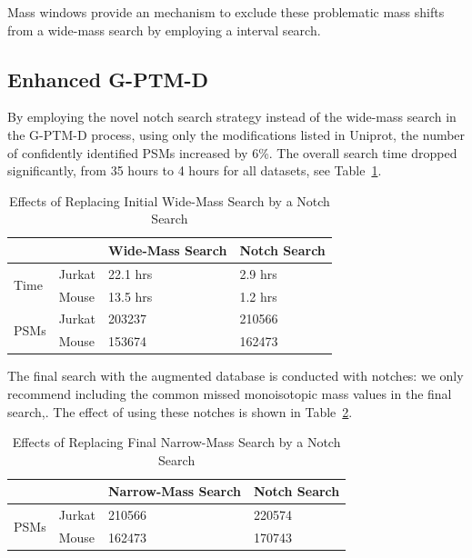 \documentclass[journal=jprobs,manuscript=article]{achemso}
\begin{document}
Mass windows provide an mechanism to exclude these problematic mass shifts from a wide-mass search by employing a interval search.

\subsection{Enhanced G-PTM-D}

By employing the novel notch search strategy instead of the wide-mass search in the G-PTM-D process, using only the modifications listed in Uniprot, the number of confidently identified PSMs increased by 6\%.
The overall search time dropped significantly, from 35 hours to 4 hours for all datasets, see Table~\ref{my-label}.

\begin{table}[]
\centering
\caption{Effects of Replacing Initial Wide-Mass Search by a Notch Search}
\label{my-label}
\begin{tabular}{ll|l|l}
                      &        & Wide-Mass Search & Notch Search\\
\hline
\multirow{2}{*}{Time} & Jurkat & 22.1 hrs         & 2.9 hrs    \\
                      & Mouse  & 13.5 hrs         & 1.2 hrs   \\
\hline
\multirow{2}{*}{PSMs} & Jurkat & 203237           & 210566    \\
                      & Mouse  & 153674           & 162473   
\end{tabular}
\end{table}


The final search with the augmented database is conducted with notches: we only recommend including the common missed monoisotopic mass values in the final search,.
The effect of using these notches is shown in Table~\ref{tab:table2}.

\begin{table}[]
\centering
\caption{Effects of Replacing Final Narrow-Mass Search by a Notch Search}
\label{tab:table2}
\begin{tabular}{ll|l|l}
                      &        & Narrow-Mass Search & Notch Search\\
\hline
\multirow{2}{*}{PSMs} & Jurkat  & 210566   &  220574  \\
                      & Mouse    & 162473   &   170743
\end{tabular}
\end{table}
\end{document}
